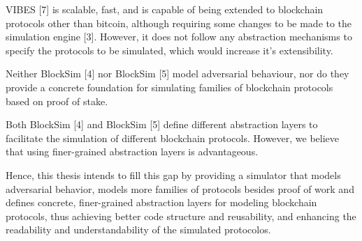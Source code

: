 
VIBES [7] is scalable, fast, and is capable of being extended to blockchain protocols other than bitcoin, although requiring some changes to be made to the simulation engine [3]. However, it does not follow any abstraction mechanisms to specify the protocols to be simulated, which would increase it’s extensibility.

Neither BlockSim [4] nor BlockSim [5] model adversarial behaviour, nor do they provide a concrete foundation for simulating families of blockchain protocols based on proof of stake.

Both BlockSim [4] and BlockSim [5] define different abstraction layers to facilitate the simulation of different blockchain protocols. However, we believe that using finer-grained abstraction layers is advantageous.

\vspace{0.25cm}

Hence, this thesis intends to fill this gap by providing a simulator that models adversarial behavior, models more families of protocols besides proof of work and defines concrete, finer-grained abstraction layers for modeling blockchain protocols, thus achieving better code structure and reusability, and enhancing the readability and understandability of the simulated protocolos.



